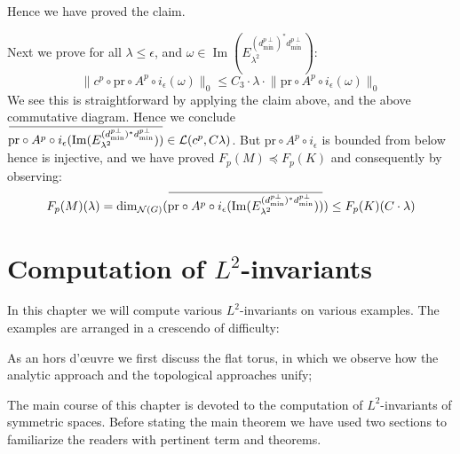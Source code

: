 \documentclass[11pt]{report}
\theoremstyle{definition}
\theoremstyle{plain}
\DeclareMathOperator{\im}{Im}
\newcommand{\vna}{\mathcal{N}}
\newcommand{\overbar}[1]{\mkern 1.5mu\overline{\mkern-1.5mu#1\mkern-1.5mu}\mkern 1.5mu}
\renewcommand{\bar}{\overbar}
\newcommand{\norm}[1]{\lVert #1 \rVert}
\begin{document}
Hence we have proved the claim. 
\par Next we prove for all $\lambda\leq \epsilon$, and $\omega\in \im(E^{(d^{p\perp}_{\min})^*d^{p\perp}_{\min}}_{\lambda^2})$:
\begin{equation}
\norm{c^p\circ \mathrm{pr}\circ A^p\circ i_{\epsilon}(\omega)}_0\leq C_3\cdot \lambda\cdot \norm{\mathrm{pr}\circ A^p\circ i_{\epsilon}(\omega)}_0
\end{equation}
We see this is straightforward by applying the claim above,  and the above commutative diagram. Hence we conclude $\bar{\mathrm{pr}\circ A^p\circ i_{\epsilon}(\im(E^{(d^{p\perp}_{\min})^*d^{p\perp}_{\min}}_{\lambda^2}))}\in \mathcal{L}(c^p, C\lambda)$. But $\mathrm{pr}\circ A^p\circ i_{\epsilon}$ is bounded from below hence is injective, and we have proved $F_p(M)\preceq F_p(K)$ and consequently  by observing:
\begin{equation}
F_p(M)(\lambda)=\dim_{\vna(G)}(\bar{\mathrm{pr}\circ A^p\circ i_{\epsilon}(\im(E^{(d^{p\perp}_{\min})^*d^{p\perp}_{\min}}_{\lambda^2}))})\leq F_p(K)(C\cdot \lambda)
\end{equation}








\chapter{Computation of $L^2$-invariants}\label{chapter3}
In this chapter we will compute various $L^2$-invariants on various examples. The examples are arranged in a crescendo of difficulty:
\par As an hors d'\oe uvre we first discuss the flat torus, in which we observe how the analytic approach and the topological approaches unify;
\par The main course of this chapter is devoted to the computation of $L^2$-invariants of symmetric spaces. Before stating the main theorem  we have used two sections to familiarize the readers with pertinent term and theorems.
\end{document}
